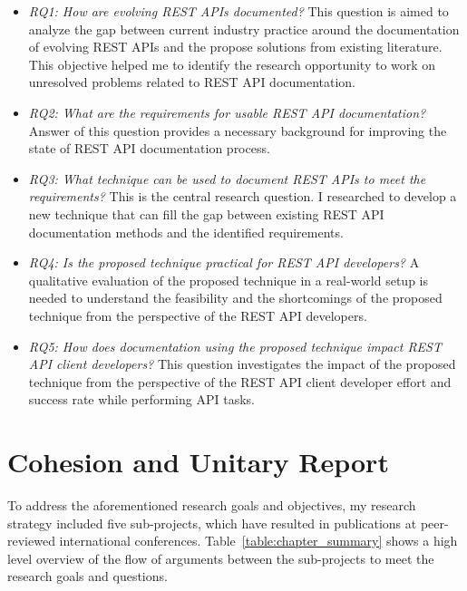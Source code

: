 \begin{itemize}
  \item \textit{RQ1: How are evolving REST APIs documented?} This question is aimed to analyze the gap between current industry practice around the documentation of evolving REST APIs and the propose solutions from existing literature. This objective helped me to identify the research opportunity to work on unresolved problems related to REST API documentation.
  \item \textit{RQ2: What are the requirements for usable REST API documentation?} Answer of this question provides a necessary background for improving the state of REST API documentation process.
  \item \textit{RQ3: What technique can be used to document REST APIs to meet the requirements?} This is the central research question. I researched to develop a new technique that can fill the gap between existing REST API documentation methods and the identified requirements.
  \item \textit{RQ4: Is the proposed technique practical for REST API developers?} A qualitative evaluation of the proposed technique in a real-world setup is needed to understand the feasibility and the shortcomings of the proposed technique from the perspective of the REST API developers.
  \item \textit{RQ5: How does documentation using the proposed technique impact REST API client developers?} This question investigates the impact of the proposed technique from the perspective of the REST API client developer effort and success rate while performing API tasks.
\end{itemize}

\section{Cohesion and Unitary Report}
To address the aforementioned research goals and objectives, my research strategy included five sub-projects, which have resulted in publications at peer-reviewed international conferences. Table~\ref{table:chapter_summary} shows a high level overview of the flow of arguments between the sub-projects to meet the research goals and questions.

